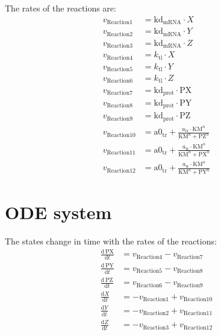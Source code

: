 \documentclass{article}
\begin{document}
The rates of the reactions are:
\begin{align*}
  v_{\mathrm{Reaction1}} &= \mathrm{kd}_{\mathrm{mRNA}} \cdot X \\
  v_{\mathrm{Reaction2}} &= \mathrm{kd}_{\mathrm{mRNA}} \cdot Y \\
  v_{\mathrm{Reaction3}} &= \mathrm{kd}_{\mathrm{mRNA}} \cdot Z \\
  v_{\mathrm{Reaction4}} &= k_{\mathrm{tl}} \cdot X \\
  v_{\mathrm{Reaction5}} &= k_{\mathrm{tl}} \cdot Y \\
  v_{\mathrm{Reaction6}} &= k_{\mathrm{tl}} \cdot Z \\
  v_{\mathrm{Reaction7}} &= \mathrm{kd}_{\mathrm{prot}} \cdot \mathrm{PX} \\
  v_{\mathrm{Reaction8}} &= \mathrm{kd}_{\mathrm{prot}} \cdot \mathrm{PY} \\
  v_{\mathrm{Reaction9}} &= \mathrm{kd}_{\mathrm{prot}} \cdot \mathrm{PZ} \\
  v_{\mathrm{Reaction10}} &= \mathrm{a0}_{\mathrm{tr}} + \frac{a_{\mathrm{tr}} \cdot \mathrm{KM}^{n}}{\mathrm{KM}^{n} + \mathrm{PZ}^{n}} \\
  v_{\mathrm{Reaction11}} &= \mathrm{a0}_{\mathrm{tr}} + \frac{a_{\mathrm{tr}} \cdot \mathrm{KM}^{n}}{\mathrm{KM}^{n} + \mathrm{PX}^{n}} \\
  v_{\mathrm{Reaction12}} &= \mathrm{a0}_{\mathrm{tr}} + \frac{a_{\mathrm{tr}} \cdot \mathrm{KM}^{n}}{\mathrm{KM}^{n} + \mathrm{PY}^{n}}
\end{align*}

\section{ODE system}

The states change in time with the rates of the reactions:
\begin{align*}
  \frac{\mathrm{d} \,\mathrm{PX}}{\mathrm{d} t} &= v_{\mathrm{Reaction4}} - v_{\mathrm{Reaction7}} \\
  \frac{\mathrm{d} \,\mathrm{PY}}{\mathrm{d} t} &= v_{\mathrm{Reaction5}} - v_{\mathrm{Reaction8}} \\
  \frac{\mathrm{d} \,\mathrm{PZ}}{\mathrm{d} t} &= v_{\mathrm{Reaction6}} - v_{\mathrm{Reaction9}} \\
  \frac{\mathrm{d} X}{\mathrm{d} t} &= -v_{\mathrm{Reaction1}} + v_{\mathrm{Reaction10}} \\
  \frac{\mathrm{d} Y}{\mathrm{d} t} &= -v_{\mathrm{Reaction2}} + v_{\mathrm{Reaction11}} \\
  \frac{\mathrm{d} Z}{\mathrm{d} t} &= -v_{\mathrm{Reaction3}} + v_{\mathrm{Reaction12}}
\end{align*}
\end{document}
